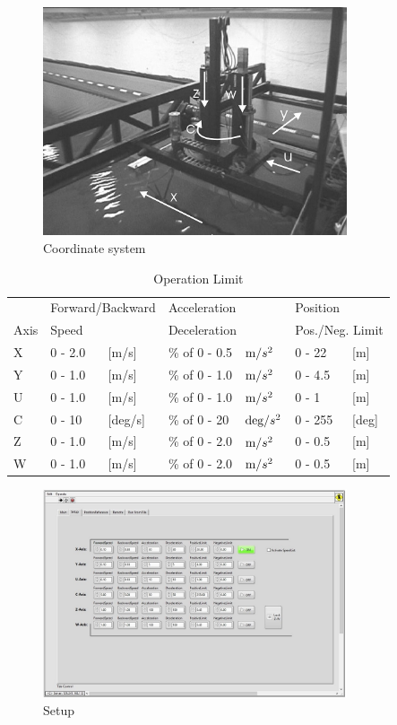 \documentclass[a4paper,english]{report}
\begin{document}
\begin{figure}[htb!]
	\centering \includegraphics[width=0.8\textwidth]{fig/towing_coordinate_photo}
	\caption{Coordinate system}
\end{figure}

\begin{table}
	\centering{}%
	\begin{tabular}{lllllll}
		\hline 
		& \multicolumn{2}{l}{Forward/Backward} & \multicolumn{2}{l}{Acceleration} & \multicolumn{2}{l}{Position}\tabularnewline
		Axis & \multicolumn{2}{l}{Speed} & \multicolumn{2}{l}{Deceleration} & \multicolumn{2}{l}{Pos./Neg. Limit}\tabularnewline
		\hline 
		X & 0 - 2.0 & {[}m/s{]}  & \% of 0 - 0.5 & $\text{m/\ensuremath{s^{2}}}$ & 0 - 22 & {[}m{]}\tabularnewline
		Y & 0 - 1.0 & {[}m/s{]}  & \% of 0 - 1.0 & $\text{m/\ensuremath{s^{2}}}$ & 0 - 4.5 & {[}m{]}\tabularnewline
		U & 0 - 1.0 & {[}m/s{]}  & \% of 0 - 1.0 & $\text{m/\ensuremath{s^{2}}}$ & 0 - 1 & {[}m{]}\tabularnewline
		C & 0 - 10  & {[}deg/s{]} & \% of 0 - 20 & $\text{deg/\ensuremath{s^{2}}}$ & 0 - 255 & {[}deg{]}\tabularnewline
		Z & 0 - 1.0 & {[}m/s{]}  & \% of 0 - 2.0 & $\text{m/\ensuremath{s^{2}}}$ & 0 - 0.5 & {[}m{]}\tabularnewline
		W & 0 - 1.0 & {[}m/s{]}  & \% of 0 - 2.0 & $\text{m/\ensuremath{s^{2}}}$ & 0 - 0.5 & {[}m{]}\tabularnewline
		\hline 
	\end{tabular}\caption{\label{tab: Operation Limit}Operation Limit}
\end{table}

\begin{figure}[htb!]
	\centering \includegraphics[width=0.8\textwidth]{fig/towing_parameteres}
	\caption{Setup}
	\label{fig: Towing parameters}
\end{figure}
\end{document}

